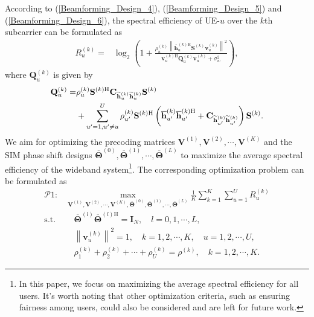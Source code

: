 \documentclass[lettersize,journal]{IEEEtran}
\theoremstyle{remark}
\begin{document}
According to (\ref{Beamforming_Design_4}), (\ref{Beamforming_Design_5}) and (\ref{Beamforming_Design_6}), the spectral efficiency of UE-$u$ over the $k$th subcarrier can be formulated as
\begin{align}\label{Beamforming_Design_7}
    R_u^{(k)}=&\log_2\left(1+\frac{\rho_u^{(k)}\left\|\overline{\mathbf{h}}_u^{(k)\mathrm{H}}
    \mathbf{S}^{(k)}\mathbf{v}_u^{(k)}\right\|^2}
    {\mathbf{v}_u^{(k)\mathrm{H}}\mathbf{Q}_u^{(k)}\mathbf{v}_u^{(k)}+\sigma_w^2}\right),
\end{align}
where $\mathbf{Q}_u^{(k)}$ is given by
\begin{align}\label{Beamforming_Design_7_2}
    \notag\mathbf{Q}_u^{(k)}=&\rho_u^{(k)}\mathbf{S}^{(k)\mathrm{H}}\mathbf{C}_{\widetilde{\mathbf{h}}_u^{(k)}
    \widetilde{\mathbf{h}}_u^{(k)}}\mathbf{S}^{(k)}\\
    &+\sum_{u'=1,u'\neq u}^{U}\rho_{u'}^{(k)}
    \mathbf{S}^{(k)\mathrm{H}}
    \left(\overline{\mathbf{h}}_{u'}^{(k)}\overline{\mathbf{h}}_{u'}^{(k)\mathrm{H}}
    +\mathbf{C}_{\widetilde{\mathbf{h}}_{u'}^{(k)}\widetilde{\mathbf{h}}_{u'}^{(k)}}\right)
    \mathbf{S}^{(k)}.
\end{align}
We aim for optimizing the precoding matrices $\mathbf{V}^{(1)},\mathbf{V}^{(2)},\cdots,\mathbf{V}^{(K)}$ and the SIM phase shift designs  $\overline{\mathbf{\Theta}}^{(0)},\overline{\mathbf{\Theta}}^{(1)},\cdots,
\overline{\mathbf{\Theta}}^{(L)}$ to maximize the average spectral efficiency of the wideband system\footnote{In this paper, we focus on maximizing the average spectral efficiency for all users. It's worth noting that other optimization criteria, such as ensuring fairness among users, could also be considered and are left for future work.}. The corresponding optimization problem can be formulated as
\begin{align}\label{Beamforming_Design_8}
    \mathcal{P}\mathrm{1}:&\max_{\mathbf{V}^{(1)},\mathbf{V}^{(2)},\cdots,\mathbf{V}^{(K)},
    \overline{\mathbf{\Theta}}^{(0)},\overline{\mathbf{\Theta}}^{(1)},\cdots,
    \overline{\mathbf{\Theta}}^{(L)}}\frac{1}{K}\sum_{k=1}^{K}\sum_{u=1}^{U}R_u^{(k)}\\
    \text{s.t.}&\quad \overline{\mathbf{\Theta}}^{(l)}
    \overline{\mathbf{\Theta}}^{(l)\mathrm{H}}=\mathbf{I}_N,\quad l=0,1,\cdots,L,\\
    &\quad \left\|\mathbf{v}_u^{(k)}\right\|^2=1,\quad k=1,2,\cdots,K,\quad u=1,2,\cdots,U,\\
    &\quad \rho_1^{(k)}+\rho_2^{(k)}+\cdots+\rho_U^{(k)}=\rho^{(k)},\quad k=1,2,\cdots,K.
\end{align}
\end{document}
